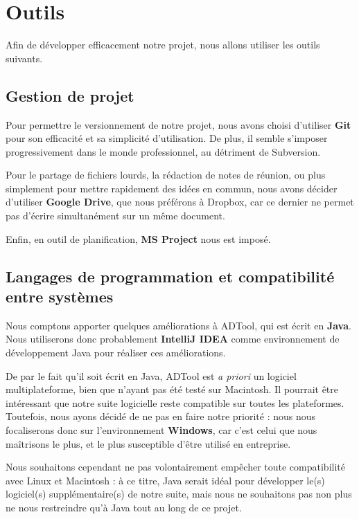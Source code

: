 \section{Outils}
    Afin de développer efficacement notre projet, nous allons utiliser les outils suivants.
     
    \subsection{Gestion de projet}
        Pour permettre le versionnement de notre projet, nous avons choisi d'utiliser {\bf Git} pour son efficacité et sa simplicité d'utilisation. De plus, il semble s'imposer progressivement dans le monde professionnel, au détriment de Subversion.
        
        Pour le partage de fichiers lourds, la rédaction de notes de réunion, ou plus simplement pour mettre rapidement des idées en commun, nous avons décider d'utiliser {\bf Google Drive}, que nous préférons à Dropbox, car ce dernier ne permet pas d'écrire simultanément sur un même document.

        Enfin, en outil de planification, {\bf MS Project} nous est imposé.

    \subsection{Langages de programmation et compatibilité entre systèmes}
        Nous comptons apporter quelques améliorations à ADTool, qui est écrit en {\bf Java}. Nous utiliserons donc probablement {\bf IntelliJ IDEA} comme environnement de développement Java pour réaliser ces améliorations.
        
        De par le fait qu'il soit écrit en Java, ADTool est {\itshape a priori} un logiciel multiplateforme, bien que n'ayant pas été testé sur Macintosh. Il pourrait être intéressant que notre suite logicielle reste compatible sur toutes les plateformes. Toutefois, nous ayons décidé de ne pas en faire notre priorité : nous nous focaliserons donc sur l'environnement {\bf Windows}, car c'est celui que nous maîtrisons le plus, et le plus susceptible d'être utilisé en entreprise.
        
        Nous souhaitons cependant ne pas volontairement empêcher toute compatibilité avec Linux et Macintosh : à ce titre, Java serait idéal pour développer le(s) logiciel(s) supplémentaire(s) de notre suite, mais nous ne souhaitons pas non plus ne nous restreindre qu'à Java tout au long de ce projet.
        
